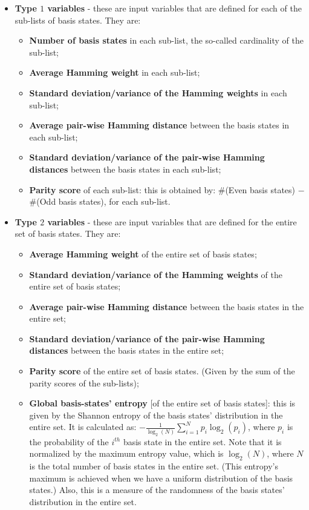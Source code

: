 \begin{itemize}
  \item {\large\textbf{Type $1$ variables}} - these are input variables that are defined for each of the sub-lists of basis states. They are:
  \begin{itemize}
      \item \textbf{Number of basis states} in each sub-list, the so-called cardinality of the sub-list;
      \item \textbf{Average Hamming weight} in each sub-list;
      \item \textbf{Standard deviation/variance of the Hamming weights} in each sub-list;
      \item \textbf{Average pair-wise Hamming distance} between the basis states in each sub-list;
      \item \textbf{Standard deviation/variance of the pair-wise Hamming distances} between the basis states in each sub-list;
      \item \textbf{Parity score} of each sub-list: this is obtained by: \#(Even basis states) $-$ \#(Odd basis states), for each sub-list.
  \end{itemize}
  \item {\large\textbf{Type $2$ variables}} - these are input variables that are defined for the entire set of basis states. They are:
  \begin{itemize}
      \item \textbf{Average Hamming weight} of the entire set of basis states;
      \item \textbf{Standard deviation/variance of the Hamming weights} of the entire set of basis states;
      \item \textbf{Average pair-wise Hamming distance} between the basis states in the entire set;
      \item \textbf{Standard deviation/variance of the pair-wise Hamming distances} between the basis states in the entire set;
      \item \textbf{Parity score} of the entire set of basis states. (Given by the sum of the parity scores of the sub-lists);
      \item \textbf{Global basis-states' entropy} [of the entire set of basis states]: this is given by the Shannon entropy of the basis states' distribution in the entire set. It is calculated as: $-\frac{1}{\log_2(N)}\sum_{i=1}^{N} p_i \log_2(p_i)$, where $p_i$ is the probability of the $i^{th}$ basis state in the entire set. Note that it is normalized by the maximum entropy value, which is $\log_2(N)$, where $N$ is the total number of basis states in the entire set. (This entropy's maximum is achieved when we have a uniform distribution of the basis states.) Also, this is a measure of the randomness of the basis states' distribution in the entire set.
  \end{itemize}
\end{itemize}
